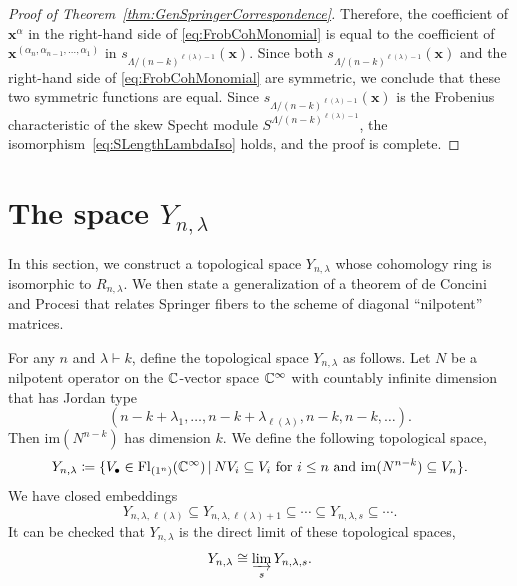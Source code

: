 \documentclass[12pt]{amsart}
\newcommand{\st}{\,|\,}
\newcommand{\Fl}{\mathrm{Fl}}
\newcommand{\Frob}{\mathrm{Frob}}
\newcommand{\la}{\lambda}
\newcommand{\im}{\mathrm{im}}
\newcommand{\bx}{\mathbf{x}}
\begin{document}
\begin{proof}[Proof of Theorem~\ref{thm:GenSpringerCorrespondence}]
Therefore, the coefficient of $\bx^\alpha$ in the right-hand side of \eqref{eq:FrobCohMonomial} is equal to the coefficient of $\bx^{(\alpha_n,\alpha_{n-1},\dots, \alpha_1)}$ in $s_{\Lambda/(n-k)^{\ell(\la)-1}}(\bx)$. Since both $s_{\Lambda/(n-k)^{\ell(\la)-1}}(\bx)$ and the right-hand side of \eqref{eq:FrobCohMonomial} are symmetric, we conclude that these two symmetric functions are equal. Since $s_{\Lambda/(n-k)^{\ell(\la)-1}}(\bx)$ is the Frobenius characteristic of the skew Specht module $S^{\Lambda/(n-k)^{\ell(\la)-1}}$, the isomorphism~\eqref{eq:SLengthLambdaIso} holds, and the proof is complete.
\end{proof}





\section{The space $Y_{n,\lambda}$}\label{sec:IndVariety}

In this section, we construct a topological space $Y_{n,\lambda}$ whose cohomology ring is isomorphic to $R_{n,\lambda}$. We then state a generalization of a theorem of de Concini and Procesi that relates Springer fibers to the scheme of diagonal ``nilpotent'' matrices.



For any $n$ and $\lambda\vdash k$, define the topological space $Y_{n,\la}$ as follows. Let $N$ be a nilpotent operator on the $\mathbb{C}$-vector space $\mathbb{C}^\infty$ with countably infinite dimension that has Jordan type \[(n-k+\la_1, \dots, n-k+\la_{\ell(\la)}, n-k,n-k,\dots).\] 
Then $\im(N^{n-k})$ has dimension $k$. We define the following topological space,
\begin{align}
    Y_{n,\la}\coloneqq \{V_\bullet\in \Fl_{(1^n)}(\bC^\infty)\st NV_i\subseteq V_i \text{ for }i\leq n\text{ and }\im(N^{n-k})\subseteq V_n\}.
\end{align}
We have closed embeddings
\[
Y_{n,\la,\ell(\la)}\subseteq Y_{n,\la,\ell(\la)+1}\subseteq\cdots\subseteq Y_{n,\la,s}\subseteq\cdots.
\]
It can be checked that $Y_{n,\la}$ is the direct limit of these topological spaces,
\[Y_{n,\la} \cong \varinjlim_s Y_{n,\la,s}.\]
\end{document}
